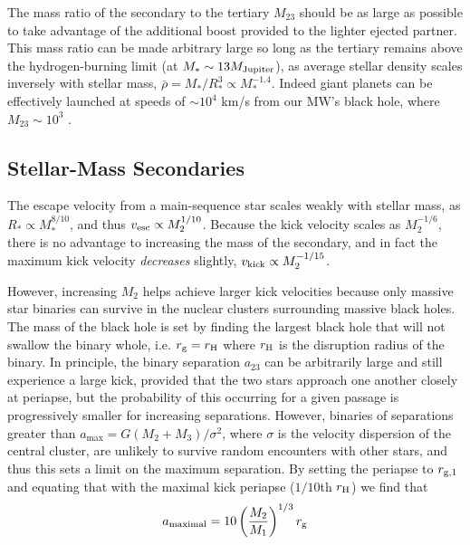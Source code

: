 \documentclass[a4paper,twocolumn]{emulateapj}
\begin{document}
The mass ratio of the secondary to the tertiary $M_{23}$ should be as large as possible to take advantage of the additional boost provided to the lighter ejected partner. This mass ratio can be made arbitrary large so long as the tertiary remains above the hydrogen-burning limit (at $M_{\ast} \sim 13 M_{\rm Jupiter}$), as average stellar density scales inversely with stellar mass, $\bar{\rho} = M_\ast / R_\ast^3 \propto M_\ast^{-1.4}$. Indeed giant planets can be effectively launched at speeds of $\sim 10^{4}$ km/s from our MW's black hole, where $M_{23} \sim 10^{3}$ \citep{Ginsburg:2012a}.

\subsection{Stellar-Mass Secondaries}
The escape velocity from a main-sequence star scales weakly with stellar mass, as $R_\ast \propto M_\ast^{8/10}$, and thus $v_{\rm esc} \propto M_2^{1/10}$. Because the kick velocity scales as $M_2^{-1/6}$, there is no advantage to increasing the mass of the secondary, and in fact the maximum kick velocity {\it decreases} slightly, $v_{\rm kick} \propto M_2^{-1/15}$.

However, increasing $M_{2}$ helps achieve larger kick velocities because only massive star binaries can survive in the nuclear clusters surrounding massive black holes. The mass of the black hole is set by finding the largest black hole that will not swallow the binary whole, i.e. $r_{\rm g} = r_{\rm H}$ where $r_{\rm H}$ is the disruption radius of the binary. In principle, the binary separation $a_{23}$ can be arbitrarily large and still experience a large kick, provided that the two stars approach one another closely at periapse, but the probability of this occurring for a given passage is progressively smaller for increasing separations. However, binaries of separations greater than $a_{\max} = G (M_{2} + M_{3}) / \sigma^2$, where $\sigma$ is the velocity dispersion of the central cluster, are unlikely to survive random encounters with other stars, and thus this sets a limit on the maximum separation. By setting the periapse to $r_{\rm g,1}$ and equating that with the maximal kick periapse ($1/10$th $r_{\rm H}$) we find that
\begin{equation}
a_{\rm maximal} = 10 \left(\frac{M_2}{M_1}\right)^{1/3} r_{\rm g}
\end{equation}
\end{document}
